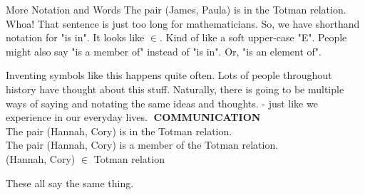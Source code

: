 \documentclass{ximera}
\begin{document}
More Notation and Words 
The pair (James, Paula) is in the Totman relation. 
Whoa! That sentence is just too long for mathematicians. So, we have shorthand notation for "is in".  It looks like $\in$.  Kind of like a soft upper-case "E".  People might also say "is a member of" instead of "is in".  Or, "is an element of".

Inventing symbols like this happens quite often. Lots of people throughout history have thought about this stuff. Naturally, there is going to be multiple ways of saying and notating the same ideas and thoughts. - just like we experience in our everyday lives.
\textbf{COMMUNICATION} \\
The pair (Hannah, Cory) is in the Totman relation. \\
The pair (Hannah, Cory) is a member of the Totman relation. \\
(Hannah, Cory) $\in$ Totman relation \\

\begin{center}
These all say the same thing.
\end{center}
\end{document}
